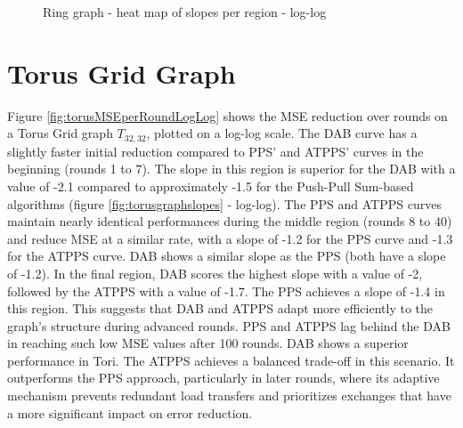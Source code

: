 \begin{figure}[h]
    \centering
    \caption{Ring graph - heat map of slopes per region - log-log}
    \label{fig:ringgraphslopes}
\end{figure}

\section{Torus Grid Graph}\label{sec:torusgridGraph}
Figure \ref{fig:torusMSEperRoundLogLog} shows the MSE reduction over rounds on a Torus Grid graph $T_{32,32}$, plotted on a log-log scale. The DAB curve has a slightly faster initial reduction compared to PPS' and ATPPS' curves in the beginning (rounds 1 to 7). The slope in this region is superior for the DAB with a value of -2.1 compared to approximately -1.5 for the Push-Pull Sum-based algorithms (figure \ref{fig:torusgraphslopes} - log-log). The PPS and ATPPS curves maintain nearly identical performances during the middle region (rounds 8 to 40) and reduce MSE at a similar rate, with a slope of -1.2 for the PPS curve and -1.3 for the ATPPS curve. DAB shows a similar slope as the PPS (both have a slope of -1.2). In the final region, DAB scores the highest slope with a value of -2, followed by the ATPPS with a value of -1.7. The PPS achieves a slope of -1.4 in this region. This suggests that DAB and ATPPS adapt more efficiently to the graph's structure during advanced rounds. PPS and ATPPS lag behind the DAB in reaching such low MSE values after 100 rounds. DAB shows a superior performance in Tori. The ATPPS achieves a balanced trade-off in this scenario. It outperforms the PPS approach, particularly in later rounds, where its adaptive mechanism prevents redundant load transfers and prioritizes exchanges that have a more significant impact on error reduction.


